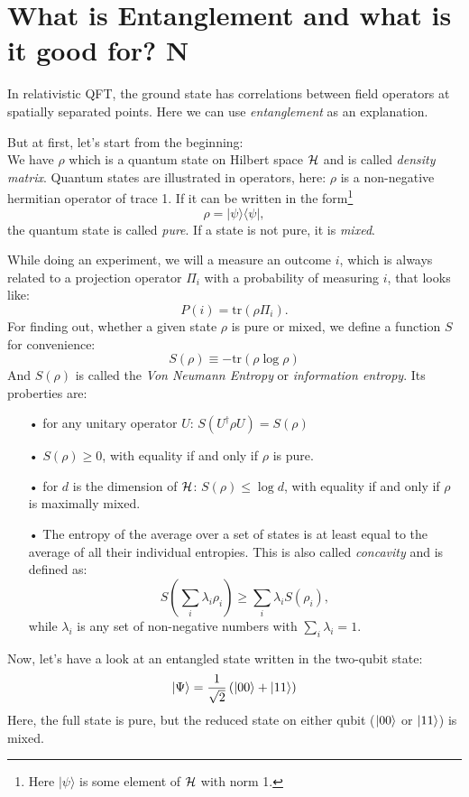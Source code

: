 \section{What is Entanglement and what is it good for? \textbf{N}}
	In relativistic QFT, the ground state has correlations between field operators at spatially separated points. Here we can use \textit{entanglement} as an explanation.
	
	But at first, let's start from the beginning:
	\\
	We have $\rho$ which is a quantum state on Hilbert space $\mathcal{H}$ and is called \textit{density matrix}. Quantum states are illustrated in operators, here: $\rho$ is a non-negative hermitian operator of trace 1. If it can be written in the form\footnote{Here $|\psi\rangle$ is some element of $\mathcal{H}$ with norm 1.}
		\begin{equation}
			\rho=|\psi\rangle \langle\psi|,
		\end{equation}
	 the quantum state is called \textit{pure}. If a state is not pure, it is \textit{mixed}.
	 
	 While doing an experiment, we will a measure an outcome $i$, which is always related to a projection operator $\Pi_i$ with a probability of measuring $i$, that looks like: 
		 \begin{equation}
	 		P(i)=\mathrm{tr}(\rho\Pi_i).
	 	\end{equation}
	 For finding out, whether a given state $\rho$ is pure or mixed, we define a function $S$ for convenience:
		\begin{equation}
			S(\rho)\equiv -\mathrm{tr}(\rho \log \rho)
		\end{equation}	 	
	And $S(\rho)$ is called the \textit{Von Neumann Entropy} or \textit{information entropy}. 
	Its proberties are:
	\FloatBarrier
	\begin{itemize}
		\item[•] for any unitary operator $U$: $S(U^\dagger \rho U)=S(\rho)$
		\item[•] $S(\rho)\geq 0$, with equality if and only if $\rho$ is pure. 
		\item[•] for $d$ is the dimension of $\mathcal{H}$: $S(\rho)\leq \log d$, with equality if and only if $\rho$ is maximally mixed.
		\item[•] The entropy of the average over a set of states is at least equal to the average of all their individual entropies. This is also called \textit{concavity} and is defined as:
		\begin{equation}
			S \left(\sum_i \lambda_i \rho_i \right) \geq \sum_i \lambda_i S(\rho_i),
		\end{equation}
			while $\lambda_i$ is any set of non-negative numbers with $\sum_i \lambda_i =1$.
	\end{itemize}
	\FloatBarrier
	Now, let's have a look at an entangled state written in the two-qubit state:
		\begin{equation}
			|\Psi\rangle = \frac{1}{\sqrt{2}} \left(\ket{00} + \ket{11} \right)
		\end{equation}
	Here, the full state is pure, but the reduced state on either qubit ($\ket{00}$ or $\ket{11}$) is mixed. \\
	
